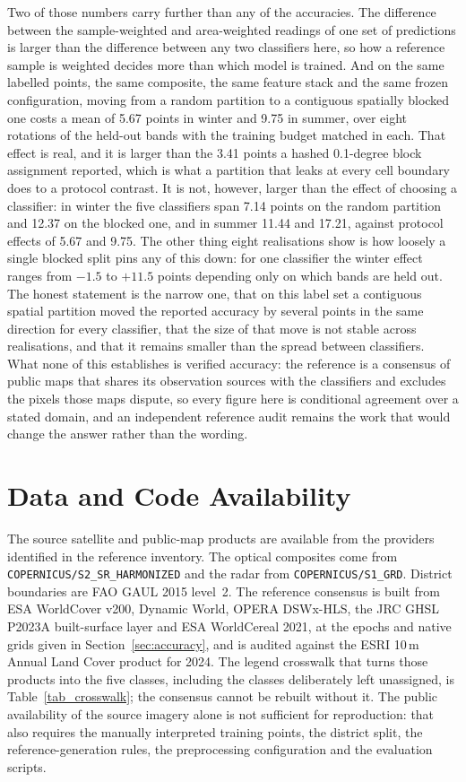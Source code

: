 \documentclass[conference]{IEEEtran}
\begin{document}
Two of those numbers carry further than any of the accuracies. The difference between the sample-weighted and area-weighted readings of one set of predictions is larger than the difference between any two classifiers here, so how a reference sample is weighted decides more than which model is trained. And on the same labelled points, the same composite, the same feature stack and the same frozen configuration, moving from a random partition to a contiguous spatially blocked one costs a mean of 5.67 points in winter and 9.75 in summer, over eight rotations of the held-out bands with the training budget matched in each. That effect is real, and it is larger than the 3.41 points a hashed 0.1-degree block assignment reported, which is what a partition that leaks at every cell boundary does to a protocol contrast. It is not, however, larger than the effect of choosing a classifier: in winter the five classifiers span 7.14 points on the random partition and 12.37 on the blocked one, and in summer 11.44 and 17.21, against protocol effects of 5.67 and 9.75. The other thing eight realisations show is how loosely a single blocked split pins any of this down: for one classifier the winter effect ranges from $-1.5$ to $+11.5$ points depending only on which bands are held out. The honest statement is the narrow one, that on this label set a contiguous spatial partition moved the reported accuracy by several points in the same direction for every classifier, that the size of that move is not stable across realisations, and that it remains smaller than the spread between classifiers. What none of this establishes is verified accuracy: the reference is a consensus of public maps that shares its observation sources with the classifiers and excludes the pixels those maps dispute, so every figure here is conditional agreement over a stated domain, and an independent reference audit remains the work that would change the answer rather than the wording.

\section*{Data and Code Availability}
The source satellite and public-map products are available from the providers identified in the reference inventory. The optical composites come from \texttt{COPERNICUS/S2\_SR\_HARMONIZED} and the radar from \texttt{COPERNICUS/S1\_GRD}. District boundaries are FAO GAUL 2015 level~2. The reference consensus is built from ESA WorldCover v200, Dynamic World, OPERA DSWx-HLS, the JRC GHSL P2023A built-surface layer and ESA WorldCereal 2021, at the epochs and native grids given in Section~\ref{sec:accuracy}, and is audited against the ESRI 10\,m Annual Land Cover product for 2024. The legend crosswalk that turns those products into the five classes, including the classes deliberately left unassigned, is Table~\ref{tab_crosswalk}; the consensus cannot be rebuilt without it. The public availability of the source imagery alone is not sufficient for reproduction: that also requires the manually interpreted training points, the district split, the reference-generation rules, the preprocessing configuration and the evaluation scripts.
\end{document}

